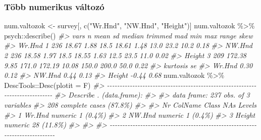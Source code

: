 \documentclass[
]{book}
\newenvironment{Shaded}{\begin{snugshade}}{\end{snugshade}}
\newcommand{\AttributeTok}[1]{\textcolor[rgb]{0.77,0.63,0.00}{#1}}
\newcommand{\CommentTok}[1]{\textcolor[rgb]{0.56,0.35,0.01}{\textit{#1}}}
\newcommand{\FunctionTok}[1]{\textcolor[rgb]{0.00,0.00,0.00}{#1}}
\newcommand{\NormalTok}[1]{#1}
\newcommand{\OtherTok}[1]{\textcolor[rgb]{0.56,0.35,0.01}{#1}}
\newcommand{\SpecialCharTok}[1]{\textcolor[rgb]{0.00,0.00,0.00}{#1}}
\newcommand{\StringTok}[1]{\textcolor[rgb]{0.31,0.60,0.02}{#1}}
\begin{document}
\hypertarget{tuxf6bb-numerikus-vuxe1ltozuxf3}{%
\subsubsection{Több numerikus változó}\label{tuxf6bb-numerikus-vuxe1ltozuxf3}}

\begin{Shaded}
\begin{Highlighting}[]
\NormalTok{num.valtozok }\OtherTok{\textless{}{-}}\NormalTok{ survey[, }\FunctionTok{c}\NormalTok{(}\StringTok{"Wr.Hnd"}\NormalTok{, }\StringTok{"NW.Hnd"}\NormalTok{, }\StringTok{"Height"}\NormalTok{)]}
\NormalTok{num.valtozok }\SpecialCharTok{\%\textgreater{}\%}\NormalTok{ psych}\SpecialCharTok{::}\FunctionTok{describe}\NormalTok{()}
\CommentTok{\#\textgreater{}        vars   n   mean   sd median trimmed   mad   min   max range skew}
\CommentTok{\#\textgreater{} Wr.Hnd    1 236  18.67 1.88   18.5   18.61  1.48  13.0  23.2  10.2 0.18}
\CommentTok{\#\textgreater{} NW.Hnd    2 236  18.58 1.97   18.5   18.55  1.63  12.5  23.5  11.0 0.02}
\CommentTok{\#\textgreater{} Height    3 209 172.38 9.85  171.0  172.19 10.08 150.0 200.0  50.0 0.22}
\CommentTok{\#\textgreater{}        kurtosis   se}
\CommentTok{\#\textgreater{} Wr.Hnd     0.30 0.12}
\CommentTok{\#\textgreater{} NW.Hnd     0.44 0.13}
\CommentTok{\#\textgreater{} Height    {-}0.44 0.68}
\NormalTok{num.valtozok }\SpecialCharTok{\%\textgreater{}\%}\NormalTok{ DescTools}\SpecialCharTok{::}\FunctionTok{Desc}\NormalTok{(}\AttributeTok{plotit =}\NormalTok{ F)}
\CommentTok{\#\textgreater{} {-}{-}{-}{-}{-}{-}{-}{-}{-}{-}{-}{-}{-}{-}{-}{-}{-}{-}{-}{-}{-}{-}{-}{-}{-}{-}{-}{-}{-}{-}{-}{-}{-}{-}{-}{-}{-}{-}{-}{-}{-}{-}{-}{-}{-}{-}{-}{-}{-}{-}{-}{-}{-}{-}{-}{-}{-}{-}{-}{-}{-}{-}{-}{-}{-}{-}{-}{-}{-}{-}{-}{-}{-}{-}{-}{-}{-}{-} }
\CommentTok{\#\textgreater{} Describe . (data.frame):}
\CommentTok{\#\textgreater{} }
\CommentTok{\#\textgreater{} data frame:  237 obs. of  3 variables}
\CommentTok{\#\textgreater{}      208 complete cases (87.8\%)}
\CommentTok{\#\textgreater{} }
\CommentTok{\#\textgreater{}   Nr  ColName  Class    NAs         Levels}
\CommentTok{\#\textgreater{}   1   Wr.Hnd   numeric   1 (0.4\%)         }
\CommentTok{\#\textgreater{}   2   NW.Hnd   numeric   1 (0.4\%)         }
\CommentTok{\#\textgreater{}   3   Height   numeric  28 (11.8\%)        }
\CommentTok{\#\textgreater{} }
\CommentTok{\#\textgreater{} }
\CommentTok{\#\textgreater{} {-}{-}{-}{-}{-}{-}{-}{-}{-}{-}{-}{-}{-}{-}{-}{-}{-}{-}{-}{-}{-}{-}{-}{-}{-}{-}{-}{-}{-}{-}{-}{-}{-}{-}{-}{-}{-}{-}{-}{-}{-}{-}{-}{-}{-}{-}{-}{-}{-}{-}{-}{-}{-}{-}{-}{-}{-}{-}{-}{-}{-}{-}{-}{-}{-}{-}{-}{-}{-}{-}{-}{-}{-}{-}{-}{-}{-}{-} }

\end{Highlighting}
\end{Shaded}
\end{document}
